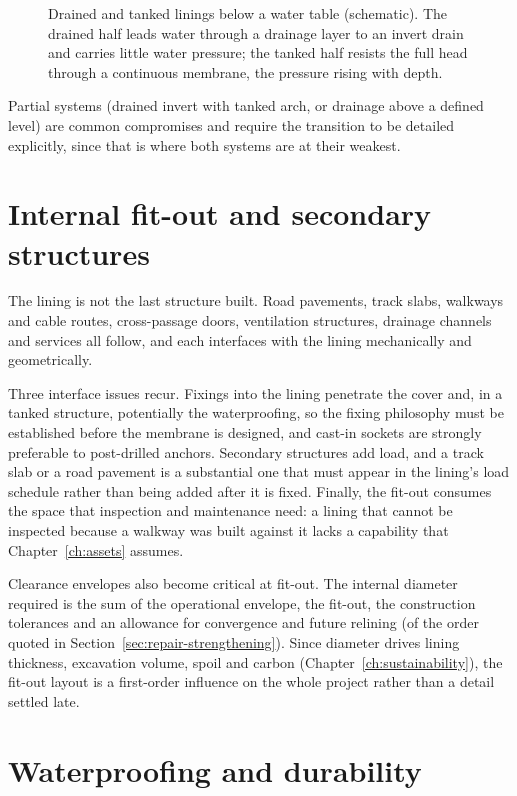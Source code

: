 \begin{figure}[htbp]
\centering
{}
\caption{Drained and tanked linings below a water table (schematic). The drained half leads water through a drainage layer to an invert drain and carries little water pressure; the tanked half resists the full head through a continuous membrane, the pressure rising with depth.}
\label{fig:drained-tanked}
\end{figure}

Partial systems (drained invert with tanked arch, or drainage above a
defined level) are common compromises and require the transition to be
detailed explicitly, since that is where both systems are at their weakest.

\section{Internal fit-out and secondary structures}
\label{sec:fitout}

The lining is not the last structure built. Road pavements, track slabs,
walkways and cable routes, cross-passage doors, ventilation structures,
drainage channels and services all follow, and each interfaces with the lining
mechanically and geometrically.

Three interface issues recur. Fixings into the lining penetrate the cover and,
in a tanked structure, potentially the waterproofing, so the fixing
philosophy must be established before the membrane is designed, and cast-in
sockets are strongly preferable to post-drilled anchors. Secondary structures
add load, and a track slab or a road pavement is a substantial one that must
appear in the lining's load schedule rather than being added after it is fixed.
Finally, the fit-out consumes the space that inspection and maintenance need: a
lining that cannot be inspected because a walkway was built against it lacks
a capability that Chapter~\ref{ch:assets} assumes.

Clearance envelopes also become critical at fit-out. The internal diameter required
is the sum of the operational envelope, the fit-out, the construction
tolerances and an allowance for convergence and future relining (of the order
quoted in Section~\ref{sec:repair-strengthening}). Since
diameter drives lining thickness, excavation volume, spoil and carbon
(Chapter~\ref{ch:sustainability}), the fit-out layout is a first-order
influence on the whole project rather than a detail settled late.

\section{Waterproofing and durability}
\label{sec:waterproofing-durability}

